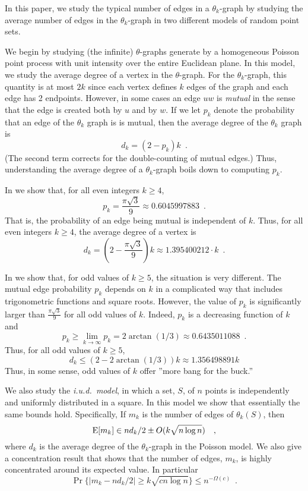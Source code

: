 \documentclass{patmorin}
\begin{document}
In this paper, we study the typical number of edges in a $\theta_k$-graph
by studying the average number of edges in the $\theta_k$-graph in 
two different models of random point sets.

We begin by studying (the infinite) $\theta$-graphs generate by a
homogeneous Poisson point process with unit intensity over the entire
Euclidean plane.  In this model, we study the average degree of a vertex
in the $\theta$-graph.  For the $\theta_k$-graph, this quantity is at
most $2k$ since each vertex defines $k$ edges of the graph and each edge
has 2 endpoints.  However, in some cases an edge $uw$ is \emph{mutual}
in the sense that the edge is created both by $u$ and by $w$.  If we
let $p_k$ denote the probability that an edge of the $\theta_k$ graph
is is mutual, then the average degree of the $\theta_k$ graph is
\[
    d_k = (2-p_k)k \enspace .
\]
(The second term corrects for the double-counting of mutual edges.)  Thus,
understanding the average degree of a $\theta_k$-graph boils down to
computing $p_k$.

In  we show that, for all even integers $k\ge 4$,
\[
    p_k=\frac{\pi\sqrt{3}}{9}\approx 0.6045997883 \enspace .
\]
That is, the probability of an edge being mutual is independent of
$k$. Thus, for all even integers $k\ge 4$, the average degree of a
vertex is
\[
  d_k = \left(2-\frac{\pi\sqrt{3}}{9}\right)k \approx 1.395400212\cdot k \enspace .
\]

In  we show that, for odd values of $k\ge 5$, the situation
is very different.  The mutual edge probability $p_k$ depends on
$k$ in a complicated way that includes trigonometric functions and
square roots.  However, the value of $p_k$ is significantly larger than
$\frac{\pi\sqrt{3}}{9}$ for all odd values of $k$.  Indeed, $p_k$ is a
decreasing function of $k$ and
\[
  p_k\ge \lim_{k\to\infty} p_k = 2\arctan(1/3)\approx 0.6435011088 \enspace .
\]
Thus, for all odd values of $k\ge 5$,
\[
   d_k \le (2-2\arctan(1/3))k \approx 1.356498891 k
\]
Thus, in some sense, odd values of $k$ offer ''more bang for the buck.''

We also study the \emph{i.u.d.\ model}, in which a set, $S$, of $n$
points is independently and uniformly distributed in a square.  In this
model we show that essentially the same bounds hold.  Specifically,
If $m_k$ is the number of edges of $\theta_k(S)$, then
\[
    \mathrm{E}[m_k] \in nd_k/2\pm O(k\sqrt{n\log n}) \enspace \enspace ,
\]
where $d_k$ is the average degree of the $\theta_k$-graph in the Poisson
model.  We also give a concentration result that shows that the number
of edges, $m_k$, is highly concentrated around its expected value.
In particular
\[
    \Pr\{|m_k - nd_k/2| \ge k\sqrt{cn\log n}\} \le n^{-\Omega(c)} \enspace .
\]
\end{document}
